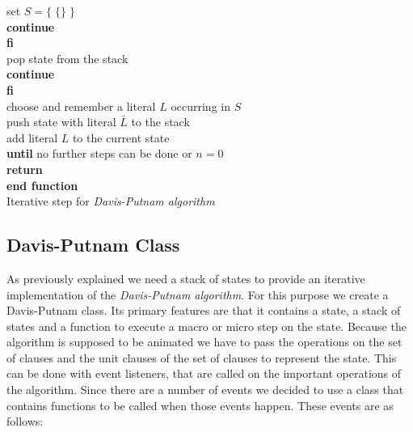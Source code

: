 \begin{listing}[h!]
                    \hspace*{2cm} set $S = \{\;\{\}\;\}$\\
                    \hspace*{2cm} \textbf{continue}\\
                \hspace*{1.5cm} \textbf{fi}\\
                \hspace*{1.5cm} pop state from the stack\\
                \hspace*{1.5cm} \textbf{continue}\\
            \hspace*{1.0cm} \textbf{fi}\\
            \hspace*{1.0cm} choose and remember a literal $L$ occurring in $S$\\
            \hspace*{1.0cm} push state with literal $\bar{L}$ to the stack\\
            \hspace*{1.0cm} add literal $L$ to the current state\\
        \hspace*{0.5cm} \textbf{until} no further steps can be done or $n = 0$\\
        \hspace*{0.5cm} \textbf{return}\\
    \textbf{end function}\\
    \caption{Iterative step for \textit{Davis-Putnam algorithm}}
    \label{code:stepDavisPutnam}
\end{listing}

\subsection{Davis-Putnam Class}
\label{sub:impDavisPutnam}
As previously explained we need a stack of states to provide an iterative implementation of the \textit{Davis-Putnam algorithm}. For this purpose we create a Davis-Putnam class. Its primary features are that it contains a state, a stack of states and a function to execute a macro or micro step on the state. Because the algorithm is supposed to be animated we have to pass the operations on the set of clauses and the unit clauses of the set of clauses to represent the state. This can be done with event listeners, that are called on the important operations of the algorithm. Since there are a number of events we decided to use a class that contains functions to be called when those events happen. These events are as follows:

